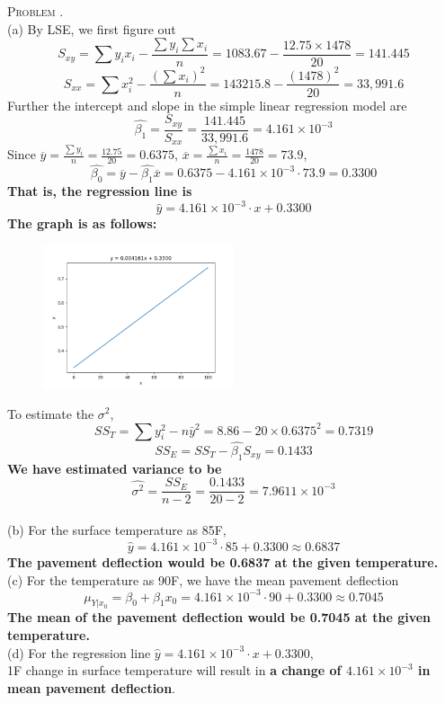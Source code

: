 \documentclass[12pt, a4paper, oneside]{article}
\newcounter{problemname}
\newenvironment{problem}{\stepcounter{problemname}\par\noindent\textsc{Problem \arabic{problemname}. }}{\\\par}
\begin{document}
\begin{problem}
    \\
    (a) By LSE, we first figure out
    $$ S_{xy} = \sum y_i x_i - \frac{\sum{y_i} \sum{x_i}}{n} = 1083.67 - \frac{12.75 \times 1478}{20} = 141.445$$
    $$ S_{xx} = \sum{x_i^2}-\frac{(\sum x_i)^2}{n} = 143215.8-\frac{(1478)^2}{20} = 33,991.6$$
    Further the intercept and slope in the simple linear regression model are 
    $$ \hat{\beta_1} = \frac{S_{xy}}{S_{xx}} 
                     = \frac{141.445}{33,991.6}
                     = 4.161 \times 10^{-3}
    $$
        Since $\overline{y} = \frac{\sum y_i}{n} = \frac{12.75}{20}=0.6375$, $\overline{x} = \frac{\sum x_i}{n} = \frac{1478}{20}=73.9$,
    $$ \hat{\beta_0} = \overline{y} - \hat{\beta_1} \overline{x} = 0.6375 - 4.161 \times 10^{-3} \cdot 73.9 = 0.3300$$
    \textbf{That is, the regression line is} $$ \hat{y} = 4.161 \times 10^{-3} \cdot x + 0.3300 $$
    \textbf{The graph is as follows: }
    \begin{figure}[H]
        \centering
        \includegraphics[width=0.5\textwidth]{fig_1.png}
    \end{figure}
    \noindent To estimate the $\sigma^2$,
    $$ SS_T = \sum y_i^2 - n \bar{y}^2 = 8.86 - 20 \times 0.6375^2 = 0.7319$$
    $$ SS_E = SS_T - \hat{\beta_1} S_{xy} = 0.1433$$
    \textbf{We have estimated variance to be }
    $$ \hat{\sigma^2} = \frac{SS_E}{n-2} = \frac{0.1433}{20-2} = 7.9611 \times 10^{-3}$$
    \\
    (b) For the surface temperature as 85F, 
    $$ \hat{y} = 4.161 \times 10^{-3} \cdot 85 + 0.3300 \approx 0.6837$$
    \textbf{The pavement deflection would be 0.6837 at the given temperature.}
    \\
    (c) For the temperature as 90F, we have the mean pavement deflection
    $$ \mu_{Y|x_0} = \beta_0 + \beta_1 x_0 = 4.161 \times 10^{-3} \cdot 90 + 0.3300 \approx 0.7045$$
    \textbf{The mean of the pavement deflection would be 0.7045 at the given temperature.}
    \\
    (d) For the regression line $ \hat{y} = 4.161 \times 10^{-3} \cdot x + 0.3300$, \\
    1F change in surface temperature will result in \textbf{a change of $4.161 \times 10^{-3}$ in mean pavement deflection}.
\end{problem}
\end{document}
